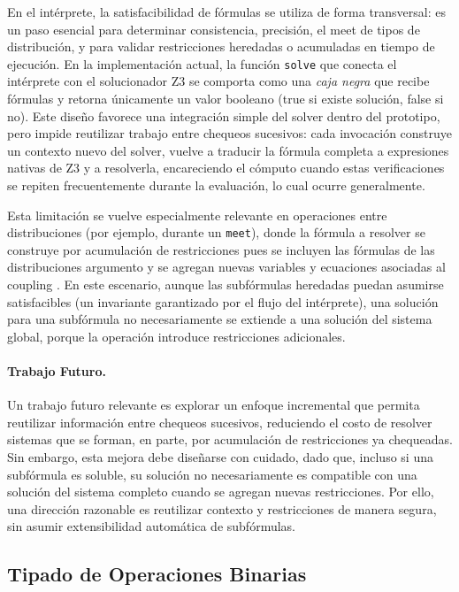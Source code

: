 En el intérprete, la satisfacibilidad de fórmulas se utiliza de forma
transversal: es un paso esencial para determinar consistencia,
precisión, el meet de tipos de distribución, y para validar
restricciones heredadas o acumuladas en tiempo de ejecución. En la
implementación actual, la función \lstinline|solve| que conecta el
intérprete con el solucionador Z3 se comporta como una \textit{caja
  negra} que recibe fórmulas y retorna únicamente un valor booleano
(true si existe solución, false si no). Este diseño favorece una
integración simple del solver dentro del prototipo, pero impide
reutilizar trabajo entre chequeos sucesivos: cada invocación construye
un contexto nuevo del solver, vuelve a traducir la fórmula completa a
expresiones nativas de Z3 y a resolverla, encareciendo el cómputo
cuando estas verificaciones se repiten frecuentemente durante la
evaluación, lo cual ocurre generalmente.

Esta limitación se vuelve especialmente relevante en operaciones entre
distribuciones (por ejemplo, durante un \lstinline|meet|), donde la
fórmula a resolver se construye por acumulación de restricciones pues
se incluyen las fórmulas de las distribuciones argumento y se agregan
nuevas variables y ecuaciones asociadas al coupling . En este
escenario, aunque las subfórmulas heredadas puedan asumirse satisfacibles
(un invariante garantizado por el flujo del intérprete), una solución para
una subfórmula no necesariamente se extiende a una solución del
sistema global, porque la operación introduce restricciones
adicionales.

\paragraph{Trabajo Futuro.}
Un trabajo futuro relevante es explorar un enfoque incremental que
permita reutilizar información entre chequeos sucesivos, reduciendo el
costo de resolver sistemas que se forman, en parte, por acumulación de
restricciones ya chequeadas. Sin embargo, esta mejora debe diseñarse
con cuidado, dado que, incluso si una subfórmula es soluble, su
solución no necesariamente es compatible con una solución del sistema
completo cuando se agregan nuevas restricciones. Por ello, una
dirección razonable es reutilizar contexto y restricciones de manera
segura, sin asumir extensibilidad automática de subfórmulas.

\subsection{Tipado de Operaciones Binarias}\label{subsec:lim-binops}

